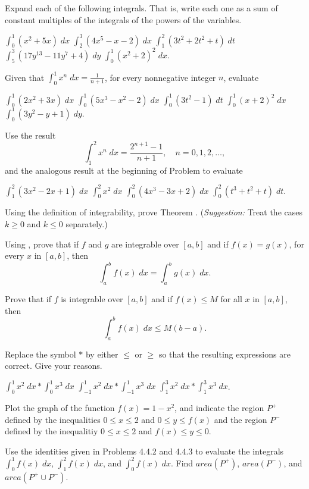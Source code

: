\begin{exercises}

Expand each of the following integrals.
That is, write each one as a sum of constant multiples
of the integrals of the powers of the variables.
\begin{exenum}
\x
$\int_0^1 (x^2 + 5x) \; dx$
\x
$\int_2^3 (4x^5 - x - 2) \; dx$
\x
$\int_1^2 (3t^2 + 2t^2 + t) \; dt$
\x
$\int_5^3 (17y^{13} - 11y^7 + 4) \; dy$
\x
$\int_0^1 (x^2 + 2)^2 \; dx$.
\end{exenum}

Given that $\int_0^1 x^n \; dx = \frac1{n+1}$,
for every nonnegative integer $n$, evaluate
\begin{exenum}
\x
$\int_0^1 (2x^2 + 3x) \; dx$
\x
$\int_0^1 (5x^3 - x^2 - 2) \; dx$
\x
$\int_0^1 (3t^2 - 1) \; dt$
\x
$\int_0^1 (x + 2)^2 \; dx$
\x
$\int_0^1 (3y^2 - y + 1) \; dy$.
\end{exenum}

Use the result
\[
\int_1^2 x^n \; dx = \frac{2^{n+1} - 1}{n+1},
\quad n=0,1,2,\ldots
,
\]
and the analogous result at the beginning of
Problem  to evaluate
\begin{exenum}
\x
$\int_1^2 (3x^2 - 2x + 1) \; dx$
\x
$\int_0^2 x^2 \; dx$
\x
$\int_0^2 (4x^3 - 3x + 2) \; dx$
\x
$\int_0^2 (t^3 + t^2 + t) \; dt$.
\end{exenum}

Using the definition of integrability,
prove Theorem .
(\emph{Suggestion:} Treat the cases
$k \geq 0$ and $k \leq 0$ separately.)

Using , prove that if $f$ and $g$ are
integrable over $[a,b]$ and if $f(x) = g(x)$,
for every $x$ in $[a,b]$, then
\[
\int_a^b f(x) \; dx = \int_a^b g(x) \; dx
.
\]

Prove that if $f$ is integrable over $[a,b]$ and if
$f(x) \leq M$ for all $x$ in $[a,b]$, then
\[
\int_a^b f(x) \; dx \leq M(b-a)
.
\]

Replace the symbol $*$ by either $\leq$ or $\geq$
so that the resulting expressions are correct.
Give your reasons.
\begin{exenum}
\x
$\int_0^1 x^2 \; dx * \int_0^1 x^3 \; dx$
\x
$\int_{-1}^1 x^2 \; dx * \int_{-1}^1 x^3 \; dx$
\x
$\int_1^3 x^2 \; dx * \int_1^3 x^3 \; dx$.
\end{exenum}

Plot the graph of the function $f(x) = 1 - x^2$,
and indicate the region $P^+$ defined by the inequalities
$0 \leq x \leq 2$ and $0 \leq y \leq f(x)$ and the region $P^-$
defined by the inequalitiy $0 \leq x \leq 2$
and $f(x) \leq y \leq 0$.
\begin{exenum}
\x
Use the identities given in Problems {4.4.2} and {4.4.3}
to evaluate the integrals
$\int_0^1 f(x) \; dx$, $\int_1^2 f(x) \; dx$,
and $\int_0^2 f(x) \; dx$.
\x
Find $\mathit{area}(P^+)$, $\mathit{area}(P^-)$,
and $\mathit{area}(P^+ \cup P^-)$.
\end{exenum}


\end{exercises}
